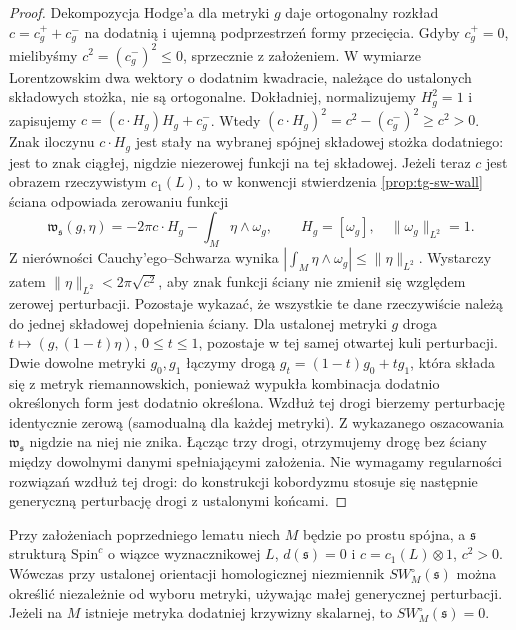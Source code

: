 \begin{proof}
Dekompozycja Hodge'a dla metryki $g$ daje ortogonalny
rozkład $c=c_g^++c_g^-$ na dodatnią i ujemną podprzestrzeń
formy przecięcia. Gdyby $c_g^+=0$, mielibyśmy
$c^2=(c_g^-)^2\le0$, sprzecznie z założeniem.
W wymiarze Lorentzowskim dwa wektory o dodatnim kwadracie,
należące do ustalonych składowych stożka, nie są ortogonalne.
Dokładniej, normalizujemy $H_g^2=1$ i zapisujemy
$c=(c\cdot H_g)H_g+c_g^-$. Wtedy
$(c\cdot H_g)^2=c^2-(c_g^-)^2\ge c^2>0$.
Znak iloczynu $c\cdot H_g$ jest stały na wybranej
spójnej składowej stożka dodatniego: jest to znak
ciągłej, nigdzie niezerowej funkcji na tej składowej.
Jeżeli teraz $c$ jest obrazem rzeczywistym $c_1(L)$,
to w konwencji stwierdzenia \ref{prop:tg-sw-wall}
ściana odpowiada zerowaniu funkcji
\[
\mathfrak w_{\mathfrak s}(g,\eta)
=-2\pi c\cdot H_g-\int_M\eta\wedge\omega_g,
\qquad H_g=[\omega_g],\quad \|\omega_g\|_{L^2}=1.
\]
Z nierówności Cauchy'ego--Schwarza wynika
$|\int_M\eta\wedge\omega_g|\le\|\eta\|_{L^2}$.
Wystarczy zatem $\|\eta\|_{L^2}<2\pi\sqrt{c^2}$,
aby znak funkcji ściany nie zmienił się względem
zerowej perturbacji.
Pozostaje wykazać, że wszystkie te dane rzeczywiście
należą do jednej składowej dopełnienia ściany.
Dla ustalonej metryki $g$ droga
$t\mapsto(g,(1-t)\eta)$, $0\le t\le1$,
pozostaje w tej samej otwartej kuli perturbacji.
Dwie dowolne metryki $g_0,g_1$ łączymy drogą
$g_t=(1-t)g_0+tg_1$, która składa się z metryk
riemannowskich, ponieważ wypukła kombinacja
dodatnio określonych form jest dodatnio określona.
Wzdłuż tej drogi bierzemy perturbację identycznie
zerową (samodualną dla każdej metryki).
Z wykazanego oszacowania $\mathfrak w_{\mathfrak s}$
nigdzie na niej nie znika.
Łącząc trzy drogi, otrzymujemy drogę bez ściany
między dowolnymi danymi spełniającymi założenia.
Nie wymagamy regularności rozwiązań wzdłuż tej drogi:
do konstrukcji kobordyzmu stosuje się następnie
generyczną perturbację drogi z ustalonymi końcami.
\end{proof}

\begin{wniosek}
\label{cor:tg-park14-small-invariant}
Przy założeniach poprzedniego lematu niech $M$ będzie
po prostu spójna, a $\mathfrak s$ strukturą $\mathrm{Spin}^c$
o wiązce wyznacznikowej $L$, $d(\mathfrak s)=0$
i $c=c_1(L)\otimes1$, $c^2>0$. Wówczas przy ustalonej orientacji
homologicznej niezmiennik $SW_M^{\circ}(\mathfrak s)$
można określić niezależnie od wyboru metryki, używając
małej generycznej perturbacji. Jeżeli na $M$ istnieje
metryka dodatniej krzywizny skalarnej, to
$SW_M^{\circ}(\mathfrak s)=0$.
\end{wniosek}

